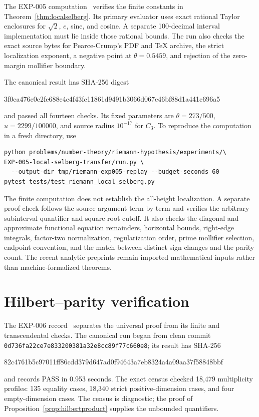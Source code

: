 \documentclass[11pt]{article}
\theoremstyle{remark}
\begin{document}
The EXP-005 computation~\cite{RecordV} verifies the finite constants in
Theorem~\ref{thm:localselberg}. Its primary evaluator uses exact rational
Taylor enclosures for $\sqrt2$, $e$, sine, and cosine. A separate
100-decimal interval implementation must lie inside those rational bounds.
The run also checks the exact source bytes for Pearce-Crump's PDF and TeX
archive, the strict localization exponent, a negative point at
$\theta=0.5459$, and rejection of the zero-margin mollifier boundary.

The canonical result has SHA-256 digest
\begin{center}\small\ttfamily
3f0ca476c0e2fe688e4e4f43fc11861d9491b3066d067e46bf88d1a441c696a5
\end{center}
and passed all fourteen checks. Its fixed parameters are
$\theta=273/500$, $u=2299/100000$, and source radius $10^{-17}$ for
$C_3$. To reproduce the computation in a fresh directory, use
\begin{verbatim}
python problems/number-theory/riemann-hypothesis/experiments/\
EXP-005-local-selberg-transfer/run.py \
  --output-dir tmp/riemann-exp005-replay --budget-seconds 60
pytest tests/test_riemann_local_selberg.py
\end{verbatim}

The finite computation does not establish the all-height localization. A
separate proof check follows the source argument term by term and verifies
the arbitrary-subinterval quantifier and square-root cutoff. It also checks
the diagonal and approximate functional equation remainders, horizontal bounds,
right-edge integrals, factor-two normalization, regularization order,
prime mollifier selection, endpoint convention, and the match between
distinct sign changes and the parity count. The recent analytic preprints
remain imported mathematical inputs rather than machine-formalized theorems.

\section{Hilbert--parity verification}

The EXP-006 record~\cite{RecordVI} separates the universal proof from its
finite and transcendental checks. The canonical run began from clean commit
\texttt{0d736fa22ce7e833200381a32e8cc89f77c660e8}; its result has SHA-256
\begin{center}\small\ttfamily
82c4761b5c97011ff86cdd379d647ad0f94643a7eb8324a4a09aa37f58848bbf
\end{center}
and records PASS in 0.953 seconds. The exact census checked 18,479
multiplicity profiles: 135 equality cases, 18,340 strict positive-dimension
cases, and four empty-dimension cases. The census is diagnostic; the proof of
Proposition~\ref{prop:hilbertproduct} supplies the unbounded quantifiers.
\end{document}
